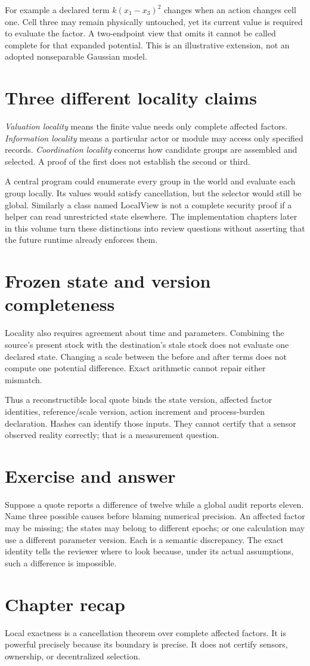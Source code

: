 For example a declared term $k(x_1-x_3)^2$ changes when an action changes
cell one. Cell three may remain physically untouched, yet its current
value is required to evaluate the factor. A two-endpoint view that omits
it cannot be called complete for that expanded potential. This is an
illustrative extension, not an adopted nonseparable Gaussian model.

\section{Three different locality claims}
\emph{Valuation locality} means the finite value needs only complete
affected factors. \emph{Information locality} means a particular actor or
module may access only specified records. \emph{Coordination locality}
concerns how candidate groups are assembled and selected. A proof of the
first does not establish the second or third.

A central program could enumerate every group in the world and evaluate
each group locally. Its values would satisfy cancellation, but the selector
would still be global. Similarly a class named LocalView is not a complete
security proof if a helper can read unrestricted state elsewhere. The implementation chapters later in this volume turn these distinctions into review questions without asserting that the
future runtime already enforces them.

\section{Frozen state and version completeness}
Locality also requires agreement about time and parameters. Combining the
source's present stock with the destination's stale stock does not evaluate
one declared state. Changing a scale between the before and after terms
does not compute one potential difference. Exact arithmetic cannot repair
either mismatch.

Thus a reconstructible local quote binds the state version, affected factor
identities, reference/scale version, action increment and process-burden
declaration. Hashes can identify those inputs. They cannot certify that a
sensor observed reality correctly; that is a measurement question.

\section*{Exercise and answer}
Suppose a quote reports a difference of twelve while a global audit reports
eleven. Name three possible causes before blaming numerical precision.
An affected factor may be missing; the states may belong to different
epochs; or one calculation may use a different parameter version. Each is
a semantic discrepancy. The exact identity tells the reviewer where to
look because, under its actual assumptions, such a difference is impossible.

\section*{Chapter recap}
Local exactness is a cancellation theorem over complete affected factors.
It is powerful precisely because its boundary is precise. It does not
certify sensors, ownership, or decentralized selection.
